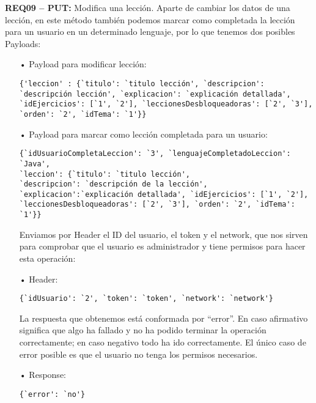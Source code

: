 \textbf{REQ09 – PUT:} Modifica una lección. Aparte de cambiar los datos de una lección, en este método también podemos marcar como completada la lección para un usuario en un determinado lenguaje, por lo que tenemos dos posibles Payloads:
\begin{itemize}
\item[•]Payload para modificar lección:
{\codesize
\begin{verbatim}
{'leccion' : {`titulo': `titulo lección', `descripcion': 
`descripción lección', `explicacion': `explicación detallada', 
`idEjercicios': [`1', `2'], `leccionesDesbloqueadoras': [`2', `3'], 
`orden': `2', `idTema': `1'}}
\end{verbatim}
}

\item[•]
Payload para marcar como lección completada para un usuario:
{\codesize
\begin{verbatim}
{`idUsuarioCompletaLeccion': `3', `lenguajeCompletadoLeccion': `Java', 
`leccion': {`titulo': `titulo lección', 
`descripcion': `descripción de la lección', 
`explicacion':`explicación detallada', `idEjercicios': [`1', `2'], 
`leccionesDesbloqueadoras': [`2', `3'], `orden': `2', `idTema': `1'}}
\end{verbatim}
}

Enviamos por Header el ID del usuario, el token y el network, que nos sirven para comprobar que el usuario es administrador y tiene permisos para hacer esta operación:
\item[•]Header:
{\codesize
\begin{verbatim}
{`idUsuario': `2', `token': `token', `network': `network'}
\end{verbatim}
}

La respuesta que obtenemos está conformada por ``error''. En caso afirmativo significa que algo ha fallado y no ha podido terminar la operación correctamente; en caso negativo todo ha ido correctamente. El único caso de error posible es que el usuario no tenga los permisos necesarios.
\item[•]Response:
{\codesize
\begin{verbatim} 
{`error': `no'}
\end{verbatim}
}
\end{itemize}

